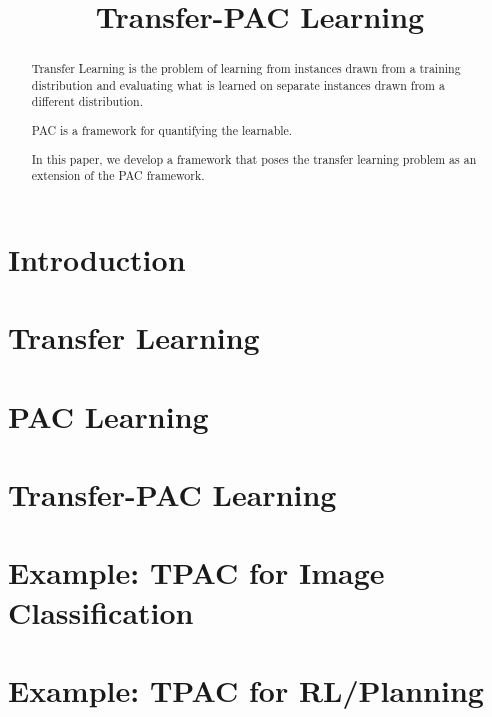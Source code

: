 \documentclass[11pt]{article}
\title{Transfer-PAC Learning}
\begin{document}
\maketitle

\begin{abstract}
Transfer Learning is the problem of learning from instances drawn from a training distribution and evaluating what is learned on separate instances drawn from a different distribution.

PAC is a framework for quantifying the learnable.

In this paper, we develop a framework that poses the transfer learning problem as an extension of the PAC framework.



\end{abstract}

\section{Introduction}

\section{Transfer Learning}

\section{PAC Learning}

\section{Transfer-PAC Learning}

\section{Example: TPAC for Image Classification}

\section{Example: TPAC for RL/Planning}
\end{document}
